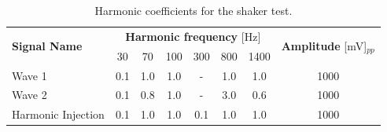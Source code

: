 \begin{table}
    \centering
    \caption{Harmonic coefficients for the shaker test.}
    \label{tab:shaker_param_01}
    \begin{tabular}{lccccccc} 
    \toprule
    \multirow{2}{*}{\textbf{Signal Name }} & \multicolumn{6}{c}{\textbf{Harmonic frequency} [Hz]} & \multirow{2}{*}{\textbf{Amplitude} [mV]$_{pp}$} \\
     & 30 & 70 & 100 & 300 & 800 & 1400 &  \\ 
    \hline
    Wave 1 & 0.1 & 1.0 & 1.0 & \multicolumn{1}{c}{-} & 1.0 & 1.0 & 1000 \\
    Wave 2 & 0.1 & 0.8 & 1.0 & \multicolumn{1}{c}{-} & 3.0 & 0.6 & 1000 \\
    Harmonic Injection & 0.1 & 1.0 & 1.0 & 0.1 & 1.0 & 1.0 & 1000 \\
    \bottomrule
    \end{tabular}
    \end{table}

